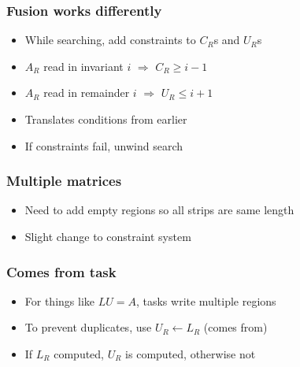 \documentclass{beamer}
\newcommand*{\bracelabel}[4]{\draw (#1) to[brace #3]%
  node[midway,label={[dim-label]#3:#4}] {} (#2)}
\newcommand*{\emptyreg}[1]{\draw (#1.north west) -- (#1.south east) (#1.south west) -- (#1.north east)}
\begin{document}
\begin{frame}
  \frametitle{Fusion works differently}

  \begin{itemize}
  \item While searching, add constraints to $C_R$s and $U_R$s
  \item $A_R$ read in invariant $i$ $\Rightarrow$ $C_R \geq i - 1$
  \item $A_R$ read in remainder $i$ $\Rightarrow$ $U_R \leq i + 1$
  \item Translates conditions from earlier
  \item If constraints fail, unwind search
  \end{itemize}
\end{frame}

\begin{frame}
  \frametitle{Multiple matrices}
  \begin{itemize}
  \item Need to add empty regions so all strips are same length
  \item Slight change to constraint system
  \end{itemize}

\end{frame}

\begin{frame}
  \frametitle{Comes from task}
  \begin{itemize}
  \item For things like $LU = A$, tasks write multiple regions
  \item To prevent duplicates, use $U_R \leftarrow L_R$ (comes from)
  \item If $L_R$ computed, $U_R$ is computed, otherwise not
  \end{itemize}
\end{frame}
\end{document}
